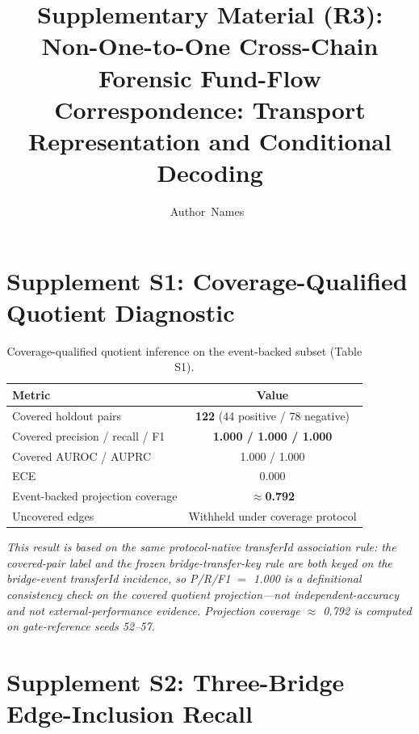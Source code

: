 \documentclass[journal]{IEEEtran}
\begin{document}
\title{Supplementary Material (R3):\\ Non-One-to-One Cross-Chain Forensic Fund-Flow Correspondence: Transport Representation and Conditional Decoding}

\author{Author~Names~}

\maketitle

\section*{Supplement S1: Coverage-Qualified Quotient Diagnostic}

\begin{table}[!t]
\caption{Coverage-qualified quotient inference on the event-backed subset (Table S1).}
\label{tab:S1}
\centering
\begin{tabular}{L{0.62\columnwidth}c}
\toprule
Metric & Value \\
\midrule
Covered holdout pairs & \textbf{122} (44 positive / 78 negative) \\
Covered precision / recall / F1 & \textbf{1.000 / 1.000 / 1.000} \\
Covered AUROC / AUPRC & 1.000 / 1.000 \\
ECE & 0.000 \\
Event-backed projection coverage & \textbf{$\approx$0.792} \\
Uncovered edges & Withheld under coverage protocol \\
\bottomrule
\end{tabular}
\end{table}

\emph{This result is based on the same protocol-native transferId association rule: the covered-pair label and the frozen bridge-transfer-key rule are both keyed on the bridge-event transferId incidence, so P/R/F1 $=$ 1.000 is a definitional consistency check on the covered quotient projection---not independent-accuracy and not external-performance evidence. Projection coverage $\approx$ 0.792 is computed on gate-reference seeds 52--57.}

\section*{Supplement S2: Three-Bridge Edge-Inclusion Recall}
\end{document}
